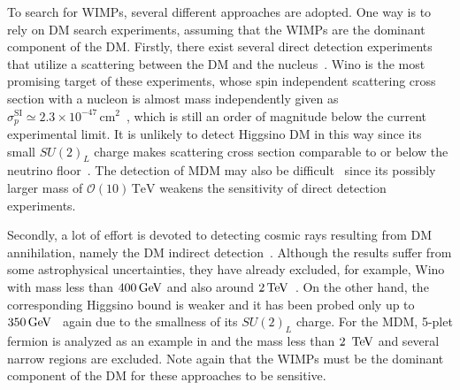 \documentclass[12pt,twoside,book]{article}
\begin{document}
To search for WIMPs, several different approaches are adopted.
One way is to rely on DM search experiments, assuming that the WIMPs are the dominant component of the DM.
Firstly, there exist several direct detection experiments that utilize a scattering between the DM and the nucleus~\cite{Akerib:2016vxi, Cui:2017nnn, Aprile:2018dbl}.
Wino is the most promising target of these experiments, whose spin independent scattering cross section with a nucleon is almost mass independently given as $\sigma_p^{\mathrm{SI}} \simeq 2.3 \times 10^{-47}\,\mathrm{cm}^2$~\cite{Hisano:2010fy, Hisano:2012wm, Hisano:2015rsa, Hill:2011be, Hill:2013hoa}, which is still an order of magnitude below the current experimental limit.
It is unlikely to detect Higgsino DM in this way since its small $SU(2)_L$ charge makes scattering cross section comparable to or below the neutrino floor~\cite{Hisano:2012wm}.
The detection of MDM may also be difficult~\cite{Hisano:2011cs} since its possibly larger mass of $\mathcal{O} (10)\,\mathrm{TeV}$ weakens the sensitivity of direct detection experiments.

Secondly, a lot of effort is devoted to detecting cosmic rays resulting from DM annihilation, namely the DM indirect detection~\cite{Fermi-LAT:2016uux, Ahnen:2016qkx, Abdallah:2016ygi, Gomez-Vargas:2013bea}.
Although the results suffer from some astrophysical uncertainties, they have already excluded, for example, Wino with mass less than $400\,{\rm GeV}$ and also around $2\,{\rm TeV}$~\cite{Bhattacherjee:2014dya}.
On the other hand, the corresponding Higgsino bound is weaker and it has been probed only up to $350\,{\rm GeV}$~\cite{Krall:2017xij} again due to the smallness of its $SU(2)_L$ charge.
For the MDM, 5-plet fermion is analyzed as an example in \cite{Abdalla:2018mve} and the mass less than $2\,~{\rm TeV}$ and several narrow regions are excluded.
Note again that the WIMPs must be the dominant component of the DM for these approaches to be sensitive.
\end{document}
